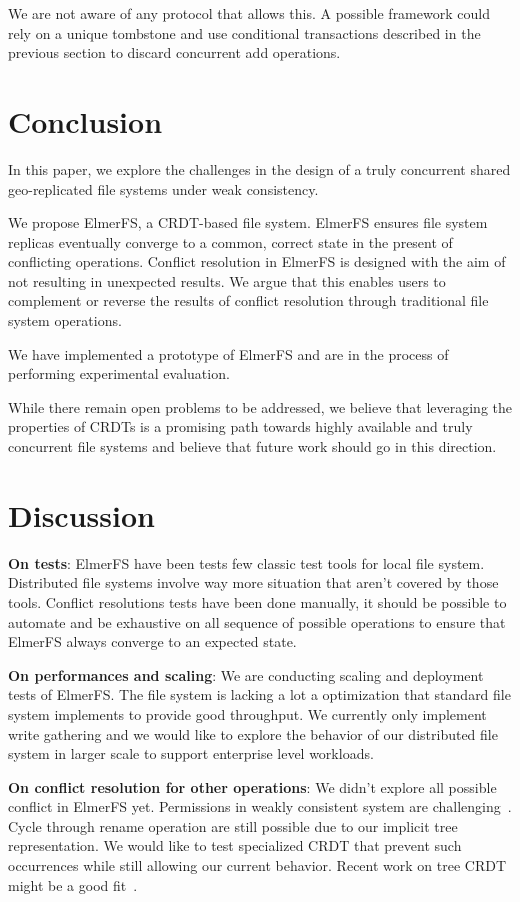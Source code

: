 \documentclass[sigconf, anonymous, 10pt]{acmart}
\begin{document}
We are not aware of any protocol that allows this.
A possible framework could rely on a unique tombstone and use conditional
transactions described in the previous section to discard concurrent
add operations.

\section{Conclusion}

In this paper, we explore the challenges in the design of a truly
concurrent shared geo-replicated file systems under weak consistency.

We propose ElmerFS, a CRDT-based file system.
ElmerFS ensures file system replicas eventually converge to a common,
correct state in the present of conflicting operations.
Conflict resolution in ElmerFS is designed with the aim of
not resulting in unexpected results.
We argue that this enables users to complement or reverse the results of conflict resolution
through traditional file system operations.

We have implemented a prototype of ElmerFS and are in the process of performing
experimental evaluation.

While there remain open problems to be addressed,
we believe that leveraging the properties of CRDTs is a promising path towards
highly available and truly concurrent file systems and believe that future
work should go in this direction.

\section{Discussion}

\textbf{On tests}: ElmerFS have been tests few classic test tools for local file system. Distributed file systems involve way more situation that aren't covered by those tools. Conflict resolutions tests have been done manually, it should be possible to automate and be exhaustive on all sequence of possible operations to ensure that ElmerFS always converge to an expected state.

\textbf{On performances and scaling}: We are conducting scaling and deployment tests of ElmerFS. The file system is lacking a lot a optimization that standard file system implements to provide good throughput. We currently only implement write gathering and we would like to explore the behavior of our distributed file system in larger scale to support enterprise level workloads.

\textbf{On conflict resolution for other operations}: We didn't explore all possible conflict in ElmerFS yet. Permissions in weakly consistent system are challenging~\cite{yanakieva2021access}. Cycle through rename operation are still possible due to our implicit tree representation. We would like to test specialized CRDT that prevent such occurrences while still allowing our current behavior. Recent work on tree CRDT might be a good fit~\cite{nair:hal-03150817}.
\end{document}
